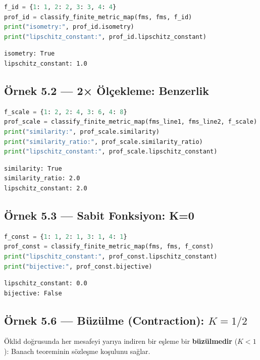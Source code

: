 \begin{lstlisting}[language=Python]
f_id = {1: 1, 2: 2, 3: 3, 4: 4}
prof_id = classify_finite_metric_map(fms, fms, f_id)
print("isometry:", prof_id.isometry)
print("lipschitz_constant:", prof_id.lipschitz_constant)
\end{lstlisting}

\begin{verbatim}
isometry: True
lipschitz_constant: 1.0
\end{verbatim}

\subsection*{Örnek 5.2 — 2× Ölçekleme: Benzerlik}

\begin{lstlisting}[language=Python]
f_scale = {1: 2, 2: 4, 3: 6, 4: 8}
prof_scale = classify_finite_metric_map(fms_line1, fms_line2, f_scale)
print("similarity:", prof_scale.similarity)
print("similarity_ratio:", prof_scale.similarity_ratio)
print("lipschitz_constant:", prof_scale.lipschitz_constant)
\end{lstlisting}

\begin{verbatim}
similarity: True
similarity_ratio: 2.0
lipschitz_constant: 2.0
\end{verbatim}

\subsection*{Örnek 5.3 — Sabit Fonksiyon: K=0}

\begin{lstlisting}[language=Python]
f_const = {1: 1, 2: 1, 3: 1, 4: 1}
prof_const = classify_finite_metric_map(fms, fms, f_const)
print("lipschitz_constant:", prof_const.lipschitz_constant)
print("bijective:", prof_const.bijective)
\end{lstlisting}

\begin{verbatim}
lipschitz_constant: 0.0
bijective: False
\end{verbatim}

\subsection*{Örnek 5.6 — Büzülme (Contraction): $K = 1/2$}

Öklid doğrusunda her mesafeyi yarıya indiren bir eşleme bir \textbf{büzülmedir}
($K<1$): Banach teoreminin sözleşme koşulunu sağlar.

